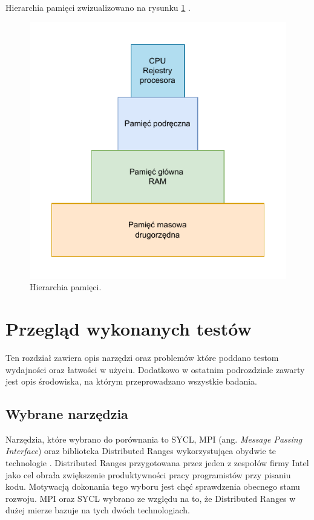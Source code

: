 \documentclass[a4paper,12pt]{book} %
\begin{document}
Hierarchia pamięci zwizualizowano na rysunku \ref{fig:hierarchia_pamieci} \cite{cache-memory}.
\begin{figure}[h]
	\centering
	\includegraphics[scale=1]{assets/hierarchia_pamieci.pdf}
	\caption{Hierarchia pamięci.}
	\label{fig:hierarchia_pamieci}
\end{figure}

\chapter{Przegląd wykonanych testów}
Ten rozdział zawiera opis narzędzi oraz problemów które poddano testom wydajności oraz łatwości w użyciu. Dodatkowo w ostatnim podrozdziale zawarty jest opis środowiska, na którym przeprowadzano wszystkie badania.
\section{Wybrane narzędzia}
Narzędzia, które wybrano do porównania to SYCL, MPI (ang. \emph{Message Passing Interface}) oraz biblioteka Distributed Ranges wykorzystująca obydwie te technologie \cite{SYCL, MPI, dist-ranges}. Distributed Ranges przygotowana przez jeden z zespołów firmy Intel jako cel obrała zwiększenie produktywności pracy programistów przy pisaniu kodu. Motywacją dokonania tego wyboru jest chęć sprawdzenia obecnego stanu rozwoju. MPI oraz SYCL wybrano ze względu na to, że Distributed Ranges w dużej mierze bazuje na tych dwóch technologiach.
\end{document}
